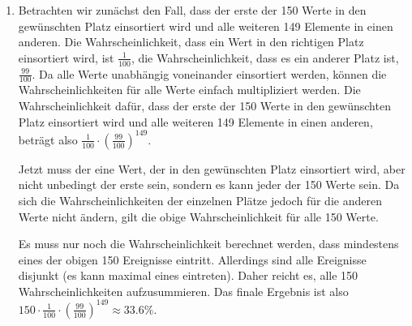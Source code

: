 \documentclass[11pt,a4paper]{article}
\begin{document}
\begin{loesung}
    \begin{enumerate}
        \item Betrachten wir zunächst den Fall, dass der erste der 150 Werte in den gewünschten Platz einsortiert wird und alle weiteren 149 Elemente in einen anderen.
        Die Wahrscheinlichkeit, dass ein Wert in den rich\-ti\-gen Platz einsortiert wird, ist $\frac{1}{100}$, die Wahrscheinlichkeit, dass es ein anderer Platz ist, $\frac{99}{100}$.
        Da alle Werte unabhängig voneinander einsortiert werden, können die Wahrscheinlichkeiten für alle Werte einfach multipliziert werden.
        Die Wahrscheinlichkeit dafür, dass der erste der 150 Werte in den gewünschten Platz einsortiert wird und alle weiteren 149 Elemente in einen anderen, beträgt also $\frac{1}{100}\cdot \left(\frac{99}{100}\right)^{149}$.

        Jetzt muss der eine Wert, der in den gewünschten Platz einsortiert wird, aber nicht unbedingt der erste sein, sondern es kann jeder der 150 Werte sein.
        Da sich die Wahrscheinlichkeiten der einzelnen Plätze jedoch für die anderen Werte nicht ändern, gilt die obige Wahrscheinlichkeit für alle 150 Werte.

        Es muss nur noch die Wahrscheinlichkeit berechnet werden, dass mindestens eines der obigen 150 Ereignisse eintritt.
        Allerdings sind alle Ereignisse disjunkt (es kann maximal eines eintreten).
        Daher reicht es, alle 150 Wahrscheinlichkeiten aufzusummieren.
        Das finale Ergebnis ist also $150 \cdot \frac{1}{100}\cdot \left(\frac{99}{100}\right)^{149} \approx 33.6\%$. 


\end{enumerate}
\end{loesung}
\end{document}
